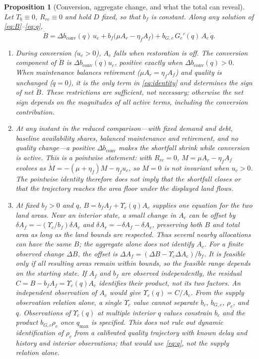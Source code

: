 \documentclass[preprint,12pt,authoryear]{elsarticle}
\newtheorem{proposition}{Proposition}
\newcommand{\dconv}{\Delta b_{\mathrm{conv}}}
\newcommand{\Ups}{\Upsilon_c}
\begin{document}
\begin{proposition}[Conversion, aggregate change, and what the total can reveal]\label{prop:mask}
Let $T_b\equiv0$, $R_{rc}\equiv0$ and hold $D$ fixed, so that $b_f$ is constant. Along any solution of \eqref{eq:B}--\eqref{eq:q},
\begin{equation}\label{eq:identity}
\dot B=\dconv(q)\,u_c+b_f\big(\mu A_r-\eta_f A_f\big)+b_{G,c}\,G_c'(q)\,A_c\,\dot q .
\end{equation}
\begin{enumerate}[label=(\roman*)]
\item During conversion ($u_c>0$), $A_c$ falls when restoration is off. The conversion component of $\dot B$ is $\dconv(q)u_c$, positive exactly when $\dconv(q)>0$. When maintenance balances retirement ($\mu A_r=\eta_fA_f$) and quality is unchanged ($\dot q=0$), it is the only term in \eqref{eq:identity} and determines the sign of net $\dot B$. These restrictions are sufficient, not necessary; otherwise the net sign depends on the magnitudes of all active terms, including the conversion contribution.
\item At any instant in the reduced comparison—with fixed demand and debt, baseline availability shares, balanced maintenance and retirement, and no quality change—a positive $\dconv$ makes the shortfall shrink while conversion is active. This is a pointwise statement: with $R_{rc}=0$, $M=\mu A_r-\eta_fA_f$ evolves as $\dot M=-(\mu+\eta_f)M-\eta_fu_c$, so $M=0$ is not invariant when $u_c>0$. The pointwise identity therefore does not imply that the shortfall closes or that the trajectory reaches the area floor under the displayed land flows.
\item At fixed $b_f>0$ and $q$, $B=b_fA_f+\Ups(q)A_c$ supplies one equation for the two land areas. Near an interior state, a small change in $A_c$ can be offset by $\delta A_f=-(\Ups/b_f)\delta A_c$ and $\delta A_r=-\delta A_f-\delta A_c$, preserving both $B$ and total area as long as the land bounds are respected. Thus several nearby allocations can have the same $B$; the aggregate alone does not identify $A_c$. For a finite observed change $\Delta B$, the offset is $\Delta A_f=(\Delta B-\Ups\Delta A_c)/b_f$. It is feasible only if all resulting areas remain within bounds, so the feasible range depends on the starting state. If $A_f$ and $b_f$ are observed independently, the residual $C=B-b_fA_f=\Ups(q)A_c$ identifies their product, not its two factors. An independent observation of $A_c$ would give $\Ups(q)=C/A_c$. From the supply observation relation alone, a single $\Ups$ value cannot separate $b_c$, $b_{G,c}$, $\rho_c$, and $q$. Observations of $\Ups(q)$ at multiple interior $q$ values constrain $b_c$ and the product $b_{G,c}\rho_c$ once $q_{\max}$ is specified. This does not rule out dynamic identification of $\rho_c$ from a calibrated quality trajectory with known delay and history and interior observations; that would use \eqref{eq:q}, not the supply relation alone.
\end{enumerate}
\end{proposition}
\end{document}
